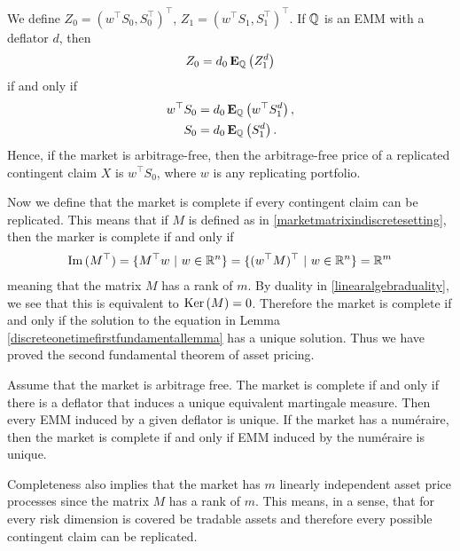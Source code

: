 We define $Z_0 = (w^{\top} S_0, S_0^{\top})^{\top}$, $Z_1 = (w^{\top} S_1, S_1^{\top})^{\top}$. If $\mathbb{Q}$ is an EMM with a deflator $d$, then
  	\begin{align}
		Z_0 = d_0 \operatorname{\boldsymbol{\mathrm{E}}}_{\mathbb{Q}} \left( Z^d_1 \right)
	\end{align}
if and only if 
  	\begin{align}
		w^{\top} S_0 &= d_0 \operatorname{\boldsymbol{\mathrm{E}}}_{\mathbb{Q}} \left( w^{\top} S^d_1 \right) ,\\
		S_0 &= d_0 \operatorname{\boldsymbol{\mathrm{E}}}_{\mathbb{Q}} \left( S^d_1 \right) .
	\end{align}
Hence, if the market is arbitrage-free, then the arbitrage-free price of a replicated contingent claim $X$ is
$w^{\top} S_0$, where $w$ is any replicating portfolio.

Now we define that the market is complete if every contingent claim can be replicated. This means that if $M$ is defined as in \ref{marketmatrixindiscretesetting}, then the marker is complete if and only if 
  \begin{align}
    \operatorname{\mathrm{Im}}{ (M^{\top}) } = \{ M^{\top} w \ | \ w \in \mathbb{R}^n \} = \{ (w^{\top} M)^{\top} \ | \ w \in \mathbb{R}^n \} = \mathbb{R}^m
  \end{align} 
meaning that the matrix $M$ has a rank of $m$. By duality in \ref{linearalgebraduality}, we see that this is equivalent to $\operatorname{\mathrm{Ker}}{ ( M ) } = 0$. Therefore the market is complete if and only if the solution to the equation in Lemma \ref{discreteonetimefirstfundamentallemma} has a unique solution. Thus we have proved the second fundamental theorem of asset pricing.

\begin{thm}
Assume that the market is arbitrage free. The market is complete if and only if there is a deflator that induces a unique equivalent martingale measure. Then every EMM induced by a given deflator is unique. If the market has a num\'{e}raire, then the market is complete if and only if EMM induced by the num\'{e}raire is unique.
\end{thm}

Completeness also implies that the market has $m$ linearly independent asset price processes since the matrix $M$ has a rank of $m$. This means, in a sense, that for every risk dimension is covered be tradable assets and therefore every possible contingent claim can be replicated.

